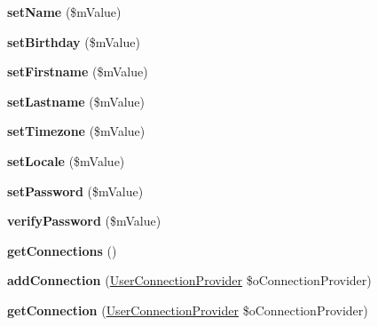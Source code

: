 \begin{DoxyCompactItemize}
\item 
\hypertarget{class_user_a3945186cc81432b434a97b6f7faddaaf}{{\bfseries set\-Name} (\$m\-Value)}\label{class_user_a3945186cc81432b434a97b6f7faddaaf}

\item 
\hypertarget{class_user_abc390b3ad58404e947d0f1f860159514}{{\bfseries set\-Birthday} (\$m\-Value)}\label{class_user_abc390b3ad58404e947d0f1f860159514}

\item 
\hypertarget{class_user_a7f5656a5802eeac1bf09c894a0183e24}{{\bfseries set\-Firstname} (\$m\-Value)}\label{class_user_a7f5656a5802eeac1bf09c894a0183e24}

\item 
\hypertarget{class_user_adbe721c5e2272cb917dc33efa79c3d4d}{{\bfseries set\-Lastname} (\$m\-Value)}\label{class_user_adbe721c5e2272cb917dc33efa79c3d4d}

\item 
\hypertarget{class_user_af34ee282a3bd3add95b62bffe2d232c1}{{\bfseries set\-Timezone} (\$m\-Value)}\label{class_user_af34ee282a3bd3add95b62bffe2d232c1}

\item 
\hypertarget{class_user_a119252ef27d6c46a35e026f57da94b1d}{{\bfseries set\-Locale} (\$m\-Value)}\label{class_user_a119252ef27d6c46a35e026f57da94b1d}

\item 
\hypertarget{class_user_afff180c99c7f9f1dc8500556d56626f7}{{\bfseries set\-Password} (\$m\-Value)}\label{class_user_afff180c99c7f9f1dc8500556d56626f7}

\item 
\hypertarget{class_user_ad8bc101663e852d6d617755dc64be755}{{\bfseries verify\-Password} (\$m\-Value)}\label{class_user_ad8bc101663e852d6d617755dc64be755}

\item 
\hypertarget{class_user_a15be094e610dd3f35ba58f4f64ede965}{{\bfseries get\-Connections} ()}\label{class_user_a15be094e610dd3f35ba58f4f64ede965}

\item 
\hypertarget{class_user_a6ff2e579b68fbc2e58e7e5c5132aa529}{{\bfseries add\-Connection} (\hyperlink{class_user_connection_provider}{User\-Connection\-Provider} \$o\-Connection\-Provider)}\label{class_user_a6ff2e579b68fbc2e58e7e5c5132aa529}

\item 
\hypertarget{class_user_ae55dd5961bf36a772d7da6ee3dd7bd6c}{{\bfseries get\-Connection} (\hyperlink{class_user_connection_provider}{User\-Connection\-Provider} \$o\-Connection\-Provider)}\label{class_user_ae55dd5961bf36a772d7da6ee3dd7bd6c}


\end{DoxyCompactItemize}

